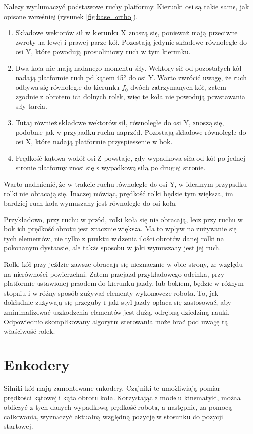 		Należy wytłumaczyć podstawowe ruchy platformy. Kierunki osi są takie same, jak 
		opisane wcześniej (rysunek \ref{fig:base_ortho}).
		\begin{enumerate}
			\item Składowe wektorów sił w kierunku X znoszą się, ponieważ mają przeciwne zwroty na lewej i prawej parze kół.
			Pozostają jedynie składowe równoległe do osi Y, które powodują prostoliniowy ruch w tym kierunku.
			\item Dwa koła nie mają nadanego momentu siły. Wektory sił od pozostałych kół nadają platformie ruch pd kątem 45° do osi Y. 
			Warto zwrócić uwagę, że ruch odbywa się równolegle do kierunku $f_0$ dwóch zatrzymanych kół, zatem zgodnie z obrotem ich dolnych rolek, więc
			te koła nie powodują powstawania siły tarcia.
			\item Tutaj również składowe wektorów sił, równoległe do osi Y, znoszą się, podobnie jak w przypadku ruchu naprzód.
			Pozostają składowe równoległe do osi X, które nadają platformie przyspieszenie w bok.
			\item Prędkość kątowa wokół osi Z powstaje, gdy wypadkowa siła od kół po jednej stronie platformy znosi się z wypadkową siłą po drugiej stronie.
		\end{enumerate}

		Warto nadmienić, że w trakcie ruchu równolegle do osi Y, w idealnym przypadku rolki nie obracają się.
		Inaczej mówiąc, prędkość rolki będzie tym większa, im bardziej ruch koła wymuszany jest równolegle do osi koła.
		
		Przykładowo, przy ruchu w przód, rolki koła się nie obracają, lecz przy ruchu w bok ich prędkość obrotu jest znacznie większa.
		Ma to wpływ na zużywanie się tych elementów, nie tylko z punktu widzenia ilości obrotów danej rolki na pokonanym dystansie, 
		ale także sposobu w jaki wymuszany jest jej ruch.
		
		Rolki kół przy jeździe zawsze obracają się nieznacznie w obie strony, ze względu na nierówności powierzchni.
		Zatem przejazd przykładowego odcinka, przy platformie ustawionej przodem do kierunku jazdy, lub bokiem, będzie w różnym stopniu i w różny sposób zużywał elementy wykonawcze robota.
		To, jak dokładnie zużywają się przeguby i jaki styl jazdy opłaca się zastosować, aby zminimalizować uszkodzenia elementów jest dużą, odrębną dziedziną nauki.
		Odpowiednio skomplikowany algorytm sterowania może brać pod uwagę tą właściwość rolek.

\section{Enkodery}
	\label{sec:encoders}
	Silniki kół mają zamontowane enkodery. Czujniki te umożliwiają pomiar prędkości kątowej i kąta obrotu koła. 
	Korzystając z modelu kinematyki, można obliczyć z tych danych wypadkową prędkość robota, a następnie, za pomocą całkowania, wyznaczyć aktualną względną
	pozycję w stosunku do pozycji startowej.
	
